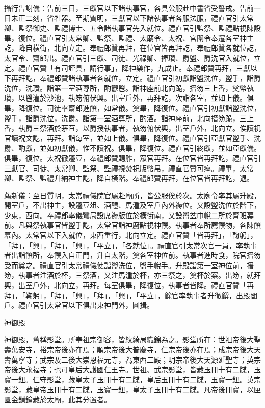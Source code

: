 \begin{pinyinscope}
 攝行告謝儀：告前三日，三獻官以下諸執事官，各具公服赴中書省受誓戒。告前一日未正二刻，省牲器。至期質明，三獻官以下諸執事者各服法服，禮直官引太常卿、監祭御史、監禮博士、五令諸執事官先入就位。禮直官引監祭、監禮點視陳設畢，復位。禮直官引太常卿、監祭、監禮、太廟令、太祝、宮闈令奉遷各室神主訖，降自橫街，北向立定。奉禮郎贊再拜，在位官皆再拜訖，奉禮郎贊各就位訖，太官令、齋郎出。禮直官引三獻、司徒、光祿卿、捧瓚、爵盥、爵洗官入就位，立定。禮直官贊「有司謹具，請行事」，降神樂作，九成止。奉禮郎贊再拜，三獻以下再拜訖，奉禮郎贊諸執事者各就位，立定。禮直官引初獻詣盥洗位，盥手，詣爵洗位，洗瓚。詣第一室酒尊所，酌鬱鬯。詣神座前北向跪，搢笏三上香，奠幣執瓚，以鬯灌於沙池，執笏俯伏興。出室戶外，再拜訖，次詣各室，並如上儀。俱畢，降復位。司徒率齋郎進饌，如常儀。奠畢，降復位。禮直官引初獻詣盥洗位，盥手，詣爵洗位，洗爵。詣第一室酒尊所，酌酒。詣神座前，北向搢笏跪，三上香，執爵三祭酒於茅苴，以爵授執事者，執笏俯伏興，出室戶外，北向立。俟讀祝官讀祝文訖，再拜。詣每室，並如上儀。俱畢，降復位。禮直官引亞獻官盥手、洗爵、酌獻，並如初獻儀，惟不讀祝。俱畢，降復位。禮直官引終獻，並如亞獻儀。俱畢，復位。太祝徹籩豆，奉禮郎贊賜胙，眾官再拜。在位官皆再拜訖，禮直官引三獻官、司徒、太常卿、監祭、監禮視焚祝版幣帛，禮直官贊可瘞。禮畢，太常卿、監祭、監禮升納神主訖，降自橫階。奉禮郎贊再拜，在位官皆再拜訖，退。



 薦新儀：至日質明，太常禮儀院官屬赴廟所，皆公服俟於次。太廟令率其屬升殿，開室戶，不出神主，設籩豆俎、酒醴、馬湩及室戶內外褥位。又設盥洗位於階下，少東，西向。奉禮郎率儀鸞局設席褥版位於橫街南，又設盥盆巾帨二所於齊班幕前。凡與祭執事官皆盥手訖，太常官詣神廚點視神饌。執事者奉所薦饌物，各陳饌幕內。太常官以下入就位，東西重行，北向立定。禮直官贊「皆再拜」，「鞠躬」，「拜」，「興」，「拜」，「興」，「平立」，「各就位」。禮直官引太常次官一員，率執事者出詣饌所，奉饌入自正門，升自太階，奠各室神位前。執事者進時食，院官搢笏受而奠之。禮直官引太常禮儀使詣盥洗位，盥手帨手。升殿詣第一室神位前，搢笏，執事者注酒於杯，三祭酒，又注馬湩於杯，亦三祭之，奠杯於案。出笏，就拜興，出室戶外，北向立，再拜。每室俱畢，降復位，執事者皆降。禮直官贊「再拜」，「鞠躬」，「拜」，「興」，「拜」，「興」，「平立」，餘官率執事者升徹饌，出殿闔戶。禮直官引太常官以下俱出東神門外，圓揖。



 神御殿



 神御殿，舊稱影堂。所奉祖宗御容，皆紋綺局織錦為之。影堂所在：世祖帝後大聖壽萬安寺，裕宗帝後亦在焉；順宗帝後大普慶寺，仁宗帝後亦在焉；成宗帝後大天壽萬寧寺；武宗及二後大崇恩福元寺，為東西二殿；明宗帝後大天源延聖寺；英宗帝後大永福寺；也可皇后大護國仁王寺。世祖、武宗影堂，皆藏玉冊十有二牒，玉寶一鈕。仁守影堂，藏皇太子玉冊十有二牒，皇后玉冊十有二牒，玉寶一鈕。英宗影堂，藏皇帝玉冊十有二牒，玉寶一鈕，皇太子玉冊十有二牒。凡帝後冊寶，以匣匱金鎖鑰藏於太廟，此其分置者。




\end{pinyinscope}
